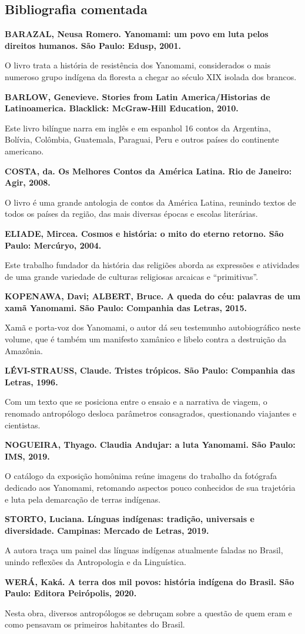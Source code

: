 \documentclass[12pt]{extarticle}
\begin{document}
\subsection{Bibliografia comentada}

\textbf{BARAZAL, Neusa Romero. Yanomami: um povo em luta pelos direitos
humanos. São Paulo: Edusp, 2001.}

O livro trata a história de resistência dos Yanomami, considerados
o mais numeroso grupo indígena da floresta a chegar ao século XIX isolada
dos brancos.

\textbf{BARLOW, Genevieve. Stories from Latin America/Historias de
Latinoamerica. Blacklick: McGraw-Hill Education, 2010.}

Este livro bilíngue narra em inglês e em espanhol 16 contos da
Argentina, Bolívia, Colômbia, Guatemala, Paraguai, Peru e outros países
do continente americano.

\textbf{COSTA, da. Os Melhores Contos da América Latina. Rio de Janeiro: Agir,
2008.}


O livro é uma grande antologia de contos da América Latina, reunindo
textos de todos os países da região, das mais diversas épocas e escolas
literárias.

\textbf{ELIADE, Mircea. Cosmos e história: o mito do eterno retorno. São
Paulo: Mercúryo, 2004.}

Este trabalho fundador da história das religiões aborda as expressões e
atividades de uma grande variedade de culturas religiosas arcaicas e
``primitivas''.

\textbf{KOPENAWA, Davi; ALBERT, Bruce. A queda do céu: palavras de um
xamã Yanomami. São Paulo: Companhia das Letras, 2015.}

Xamã e porta-voz dos Yanomami, o autor dá seu testemunho autobiográfico
neste volume, que é também um manifesto xamânico e libelo contra a
destruição da Amazônia.

\textbf{LÉVI-STRAUSS, Claude. Tristes trópicos. São Paulo: Companhia das
Letras, 1996.}

Com um texto que se posiciona entre o ensaio e a narrativa de viagem, o
renomado antropólogo desloca parâmetros consagrados, questionando
viajantes e cientistas.

\textbf{NOGUEIRA, Thyago. Claudia Andujar: a luta Yanomami. São Paulo:
IMS, 2019.}

O catálogo da exposição homônima reúne imagens do trabalho da fotógrafa
dedicado aos Yanomami, retomando aspectos pouco conhecidos de sua
trajetória e luta pela demarcação de terras indígenas.

\textbf{STORTO, Luciana. Línguas indígenas: tradição, universais e
diversidade. Campinas: Mercado de Letras, 2019.}

A autora traça um painel das línguas indígenas atualmente faladas no
Brasil, unindo reflexões da Antropologia e da Linguística.

\textbf{WERÁ, Kaká. A terra dos mil povos: história indígena do Brasil.
São Paulo: Editora Peirópolis, 2020.}

Nesta obra, diversos antropólogos se debruçam sobre a questão de quem
eram e como pensavam os primeiros habitantes do Brasil.
\end{document}
